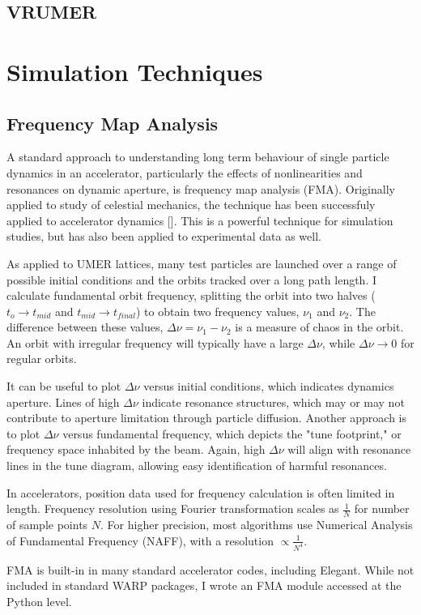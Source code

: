 \subsection{VRUMER}
\section{Simulation Techniques}
\subsection{Frequency Map Analysis}

A standard approach to understanding long term behaviour of single particle dynamics in an accelerator, particularly the effects of nonlinearities and resonances on dynamic aperture, is frequency map analysis (FMA). Originally applied to study of celestial mechanics, the technique has been successfuly applied to accelerator dynamics [\cite{Laskar2003}]. This is a powerful technique for simulation studies, but has also been applied to experimental data as well. 

As applied to UMER lattices, many test particles are launched over a range of possible initial conditions and the orbits tracked over a long path length. I calculate fundamental orbit frequency, splitting the orbit into two halves ($t_o \to t_{mid}$ and $t_{mid} \to t_{final}$) to obtain two frequency values, $\nu_1$ and $\nu_2$. The difference between these values, $\Delta \nu = \nu_1-\nu_2$ is a measure of chaos in the orbit. An orbit with irregular frequency will typically have a large $\Delta \nu$, while $\Delta \nu \to 0$ for regular orbits. 

It can be useful to plot $\Delta \nu $ versus initial conditions, which indicates dynamics aperture. Lines of high $\Delta \nu$ indicate resonance structures, which may or may not contribute to aperture limitation through particle diffusion. Another approach is to plot $\Delta \nu $ versus fundamental frequency, which depicts the "tune footprint," or frequency space inhabited by the beam. Again, high $\Delta \nu$ will align with resonance lines in the tune diagram, allowing easy identification of harmful resonances. 

In accelerators, position data used for frequency calculation is often limited in length. Frequency resolution using Fourier transformation scales as $\frac{1}{N}$ for number of sample points $N$. For higher precision, most algorithms use Numerical Analysis of Fundamental Frequency (NAFF), with a resolution $\propto \frac{1}{N^4}$. 




FMA is built-in in many standard accelerator codes, including Elegant. While not included in standard WARP packages, I wrote an FMA module accessed at the Python level. 